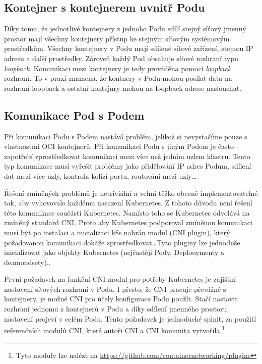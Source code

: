 \subsection{Kontejner s kontejnerem uvnitř Podu}
Díky tomu, že jednotlivé kontejnery z jednoho Podu sdílí stejný síťový jmenný prostor mají všechny kontejnery přístup ke stejným síťovým systémovým prostředkům. Všechny kontejnery v Podu mají sdílené síťové zařízení, stejnou IP adresu a další prostředky. Zároveň každý Pod obsahuje síťové rozhraní typu \textit{loopback}. Komunikaci mezi kontejnery je tedy prováděna pomocí \textit{loopback} rozhraní. To v praxi znamená, že kontnery v Podu mohou posílat data na rozhraní loopback a ostatní kontejnry mohou na loopback adrese naslouchat.%

\subsection{Komunikace Pod s Podem}
Při komunikaci Podu s Podem nastává problém, jelikož si nevystačíme pouze s vlastnostmi OCI kontejnerů. Při komunikaci Podu s jiným Podem je často zapotřebí zprostředkovat komunikaci mezi více než jedním uzlem klastru.
Tento typ komunikace musí vyřešit problémy jako přidělování IP adres Podum, sdílení dat mezi více uzly, kontrola kolizí portu, routování mezi uzly\ldots

Řešení zmíněných problémů je netriviální a velmi těžko obecně implementovatelné tak, aby vyhovovalo každému nasazení Kubernetes. Z tohoto důvodu není řešení této komunikace součástí Kubernetes. Namísto toho se Kubernetes odvolává na zmíněný standard CNI. Proto aby Kubernetes podporoval zmíněnou komunikaci musí být po instalaci a inicializaci k8s nahrán modul (CNI plugin), který požadovanou komunikaci dokáže zprostředkovat\ldots{Tyto pluginy lze jednoduše inicializovat jako objekty Kubernetes (nejčastěji Pody, Deplooymenty a deamondsety).}.

První požadavek na funkční CNI modul pro potřeby Kubernetes je zajištní nastavení síťových rozhraní v Podu. I přesto, že CNI pracuje převážně s kontejnery, je možné CNI pro účely konfigurace Podu použít. Stačí nastavit rozhraní jednomu z kontejnerů v Podu a díky sdílení jmenného prostoru nastavení projeví v celém Podu. Tento požadavek je jednoduché splnit, za použití referenčních modulů CNI, které autoři CNI a CNI komunita vytvořila.\footnote{Tyto moduly lze nalézt na \href{https://github.com/containernetworking/plugins}{https://github.com/containernetworking/plugins}}

